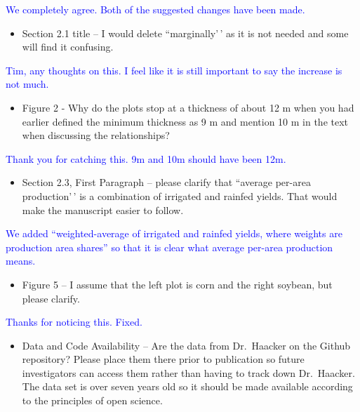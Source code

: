\documentclass[
]{article}
\providecommand{\tightlist}{%
  \setlength{\itemsep}{0pt}\setlength{\parskip}{0pt}}
\begin{document}
\textcolor{blue}{We completely agree. Both of the suggested changes have been made.}

\begin{itemize}
\tightlist
\item
  Section 2.1 title -- I would delete ``marginally'\,' as it is not
  needed and some will find it confusing.
\end{itemize}

\textcolor{blue}{Tim, any thoughts on this. I feel like it is still important to say the increase is not much.}

\begin{itemize}
\tightlist
\item
  Figure 2 - Why do the plots stop at a thickness of about 12 m when you
  had earlier defined the minimum thickness as 9 m and mention 10 m in
  the text when discussing the relationships?
\end{itemize}

\textcolor{blue}{Thank you for catching this. 9m and 10m should have been 12m.}

\begin{itemize}
\tightlist
\item
  Section 2.3, First Paragraph -- please clarify that ``average per-area
  production'\,' is a combination of irrigated and rainfed yields. That
  would make the manuscript easier to follow.
\end{itemize}

\textcolor{blue}{We added ``weighted-average of irrigated and rainfed yields, where weights are production area shares'' so that it is clear what average per-area production means.}

\begin{itemize}
\tightlist
\item
  Figure 5 -- I assume that the left plot is corn and the right soybean,
  but please clarify.
\end{itemize}

\textcolor{blue}{Thanks for noticing this. Fixed.}

\begin{itemize}
\tightlist
\item
  Data and Code Availability -- Are the data from Dr.~Haacker on the
  Github repository? Please place them there prior to publication so
  future investigators can access them rather than having to track down
  Dr.~Haacker. The data set is over seven years old so it should be made
  available according to the principles of open science.
\end{itemize}
\end{document}
